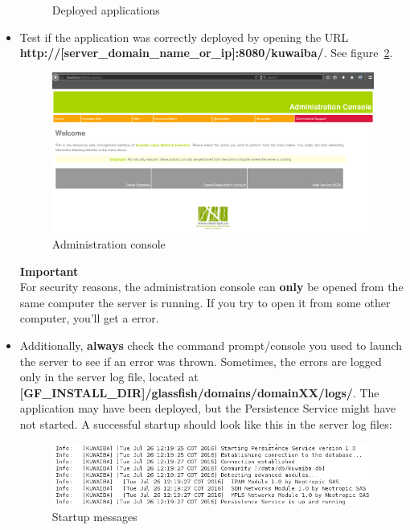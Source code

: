 \documentclass[a4paper]{article}
\begin{document}
\begin{itemize}
\begin{figure}[h!]
					\caption{Deployed applications}
					\label{fig:dapplications}		  
				\end{figure}				
				\item Test if the application was correctly deployed by opening the URL \\ \textbf{http://[server\_domain\_name\_or\_ip]:8080/kuwaiba/}. See figure~\ref{fig:kw_managementconsole}.
				\begin{figure}[h!]
					\includegraphics[width=\linewidth]{img/kw_management_console.jpg} 	
					\caption{Administration console}
					\label{fig:kw_managementconsole}
				\end{figure}
				\begin{framed} {\large \textbf{Important}} \\
					For security reasons, the administration console can \textbf{only} be opened from the same computer the server is running. If you try to open it from some other computer, you'll get a error.
				\end{framed}
				\item Additionally, \textbf{always} check the command prompt/console you used to launch the server to see if an error was thrown. Sometimes, the errors are logged only in the server log file, located at \textbf{[GF\_INSTALL\_DIR]/glassfish/domains/domainXX/logs/}. The application may have been deployed, but the Persistence Service might have not started. A successful startup should look like this in the server log files:
				\begin{figure}[h!]
					\includegraphics[width=\linewidth]{img/log_messages.png} 	
					\caption{Startup messages}
					\label{fig:startup_messages}
				\end{figure}
			\end{itemize}
			
\end{document}
